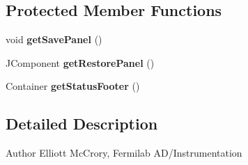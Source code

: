 \subsection*{Protected Member Functions}
\begin{DoxyCompactItemize}
\item 
\hypertarget{classgov_1_1fnal_1_1ppd_1_1dd_1_1changer_1_1SaveRestoreDefaultChannels_a3fa09ed82337d3f14ef50f8d3648d726}{void {\bfseries get\-Save\-Panel} ()}\label{classgov_1_1fnal_1_1ppd_1_1dd_1_1changer_1_1SaveRestoreDefaultChannels_a3fa09ed82337d3f14ef50f8d3648d726}

\item 
\hypertarget{classgov_1_1fnal_1_1ppd_1_1dd_1_1changer_1_1SaveRestoreDefaultChannels_af366095b3193f4912c8748d6c99ab002}{J\-Component {\bfseries get\-Restore\-Panel} ()}\label{classgov_1_1fnal_1_1ppd_1_1dd_1_1changer_1_1SaveRestoreDefaultChannels_af366095b3193f4912c8748d6c99ab002}

\item 
\hypertarget{classgov_1_1fnal_1_1ppd_1_1dd_1_1changer_1_1SaveRestoreDefaultChannels_aa9761e2f08bd4a60e557bdbbc17720a6}{Container {\bfseries get\-Status\-Footer} ()}\label{classgov_1_1fnal_1_1ppd_1_1dd_1_1changer_1_1SaveRestoreDefaultChannels_aa9761e2f08bd4a60e557bdbbc17720a6}

\end{DoxyCompactItemize}


\subsection{Detailed Description}
\begin{DoxyAuthor}{Author}
Elliott Mc\-Crory, Fermilab A\-D/\-Instrumentation 
\end{DoxyAuthor}



